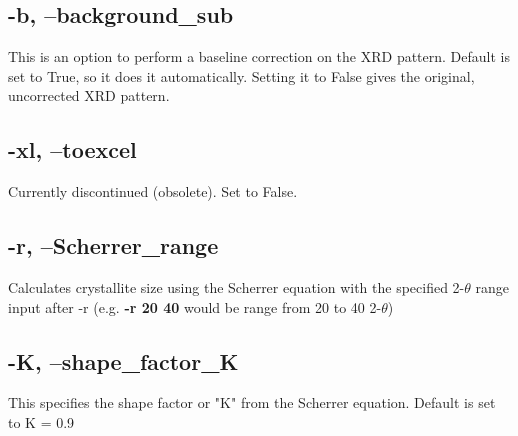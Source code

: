 \documentclass{article}
\begin{document}
\subsection{-b, --background\_sub} 
This is an option to perform a baseline correction on the XRD pattern. Default is set to True, so it does it automatically. Setting it to False gives the original, uncorrected XRD pattern. 

\subsection{-xl, --toexcel}
Currently discontinued (obsolete). Set to False. 

\subsection{-r, --Scherrer\_range} 
Calculates crystallite size using the Scherrer equation with the specified 2-$\theta$ range input after -r (e.g. \textbf{-r 20 40} would be range from 20 to 40 2-$\theta$)

\subsection{-K, --shape\_factor\_K} 
This specifies the shape factor or "K" from the Scherrer equation. Default is set to K = 0.9

               
         
\end{document}
